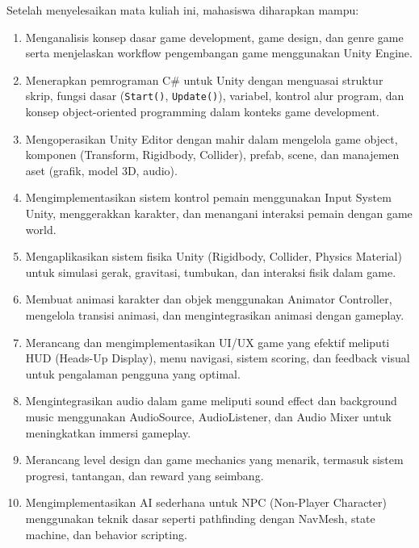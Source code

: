 \documentclass[a4paper,12pt]{article}
\begin{document}
Setelah menyelesaikan mata kuliah ini, mahasiswa diharapkan mampu:

\begin{enumerate}[label=CPMK\arabic*:]
\item Menganalisis konsep dasar game development, game design, dan genre game serta menjelaskan workflow pengembangan game menggunakan Unity Engine.

\item Menerapkan pemrograman C\# untuk Unity dengan menguasai struktur skrip, fungsi dasar (\texttt{Start()}, \texttt{Update()}), variabel, kontrol alur program, dan konsep object-oriented programming dalam konteks game development.

\item Mengoperasikan Unity Editor dengan mahir dalam mengelola game object, komponen (Transform, Rigidbody, Collider), prefab, scene, dan manajemen aset (grafik, model 3D, audio).

\item Mengimplementasikan sistem kontrol pemain menggunakan Input System Unity, menggerakkan karakter, dan menangani interaksi pemain dengan game world.

\item Mengaplikasikan sistem fisika Unity (Rigidbody, Collider, Physics Material) untuk simulasi gerak, gravitasi, tumbukan, dan interaksi fisik dalam game.

\item Membuat animasi karakter dan objek menggunakan Animator Controller, mengelola transisi animasi, dan mengintegrasikan animasi dengan gameplay.

\item Merancang dan mengimplementasikan UI/UX game yang efektif meliputi HUD (Heads-Up Display), menu navigasi, sistem scoring, dan feedback visual untuk pengalaman pengguna yang optimal.

\item Mengintegrasikan audio dalam game meliputi sound effect dan background music menggunakan AudioSource, AudioListener, dan Audio Mixer untuk meningkatkan immersi gameplay.

\item Merancang level design dan game mechanics yang menarik, termasuk sistem progresi, tantangan, dan reward yang seimbang.

\item Mengimplementasikan AI sederhana untuk NPC (Non-Player Character) menggunakan teknik dasar seperti pathfinding dengan NavMesh, state machine, dan behavior scripting.


\end{enumerate}
\end{document}
